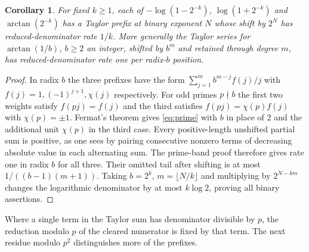 \documentclass[11pt]{article}
\newtheorem{corollary}[theorem]{Corollary}
\begin{document}
\begin{corollary}\label{cor:dyadic}
For fixed $k\ge1$, each of $-\log(1-2^{-k})$, $\log(1+2^{-k})$ and
$\arctan(2^{-k})$ has a Taylor prefix at binary exponent $N$ whose shift
by $2^N$ has reduced-denominator rate $1/k$. More generally the Taylor
series for $\arctan(1/b)$, $b\ge2$ an integer, shifted by $b^m$ and
retained through degree $m$, has reduced-denominator rate one per radix-$b$
position.
\end{corollary}
\begin{proof}
In radix $b$ the three prefixes have the form
$\sum_{j=1}^m b^{m-j} f(j)/j$ with $f(j)=1,(-1)^{j+1},\chi(j)$ respectively.
For odd primes $p\nmid b$ the first two weights satisfy $f(pj)=f(j)$
and the third satisfies $f(pj)=\chi(p)f(j)$ with $\chi(p)=\pm1$.
Fermat's theorem gives \eqref{eq:prime} with $b$ in place of $2$ and the
additional unit $\chi(p)$ in the third case. Every positive-length unshifted
partial sum is positive, as one sees by pairing consecutive nonzero
terms of decreasing absolute value in each alternating sum. The prime-band proof therefore gives
rate one in radix $b$ for all three. Their omitted tail after shifting is
at most $1/((b-1)(m+1))$. Taking $b=2^k$, $m=\lfloor N/k\rfloor$ and
multiplying by $2^{N-km}$ changes the logarithmic denominator by at most
$k\log2$, proving all binary assertions.
\end{proof}

Where a single term in the Taylor sum has denominator divisible by $p$, the reduction modulo $p$ of the cleared numerator is fixed by that term. The next residue modulo $p^2$ distinguishes more of the prefixes.
\end{document}
